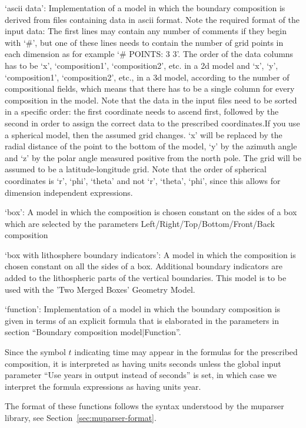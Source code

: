 \begin{itemize}
`ascii data': Implementation of a model in which the boundary composition is derived from files containing data in ascii format. Note the required format of the input data: The first lines may contain any number of comments if they begin with `\#', but one of these lines needs to contain the number of grid points in each dimension as for example `\# POINTS: 3 3'. The order of the data columns has to be `x', `composition1', `composition2', etc. in a 2d model and `x', `y', `composition1', `composition2', etc., in a 3d model, according to the number of compositional fields, which means that there has to be a single column for every composition in the model. Note that the data in the input files need to be sorted in a specific order: the first coordinate needs to ascend first, followed by the second in order to assign the correct data to the prescribed coordinates.If you use a spherical model, then the assumed grid changes. `x' will be replaced by the radial distance of the point to the bottom of the model, `y' by the azimuth angle and `z' by the polar angle measured positive from the north pole. The grid will be assumed to be a latitude-longitude grid. Note that the order of spherical coordinates is `r', `phi', `theta' and not `r', `theta', `phi', since this allows for dimension independent expressions.

`box': A model in which the composition is chosen constant on the sides of a box which are selected by the parameters Left/Right/Top/Bottom/Front/Back composition

`box with lithosphere boundary indicators': A model in which the composition is chosen constant on all the sides of a box. Additional boundary indicators are added to the lithospheric parts of the vertical boundaries. This model is to be used with the 'Two Merged Boxes' Geometry Model.

`function': Implementation of a model in which the boundary composition is given in terms of an explicit formula that is elaborated in the parameters in section ``Boundary composition model|Function''. 

Since the symbol $t$ indicating time may appear in the formulas for the prescribed composition, it is interpreted as having units seconds unless the global input parameter ``Use years in output instead of seconds'' is set, in which case we interpret the formula expressions as having units year.

The format of these functions follows the syntax understood by the muparser library, see Section~\ref{sec:muparser-format}.


\end{itemize}
